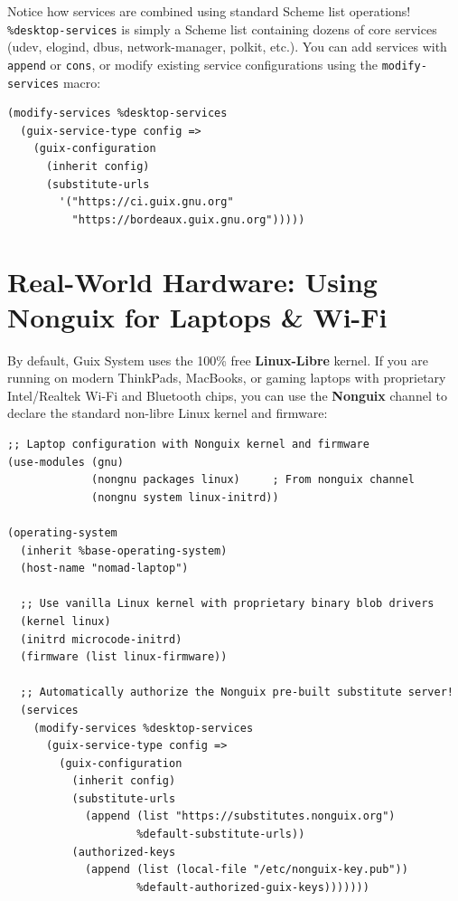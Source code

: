\begin{alchemybox}
Notice how services are combined using standard Scheme list operations!
\texttt{\%desktop-services} is simply a Scheme list containing dozens of core services (udev, elogind, dbus, network-manager, polkit, etc.).
You can add services with \texttt{append} or \texttt{cons}, or modify existing service configurations using the \texttt{modify-services} macro:
\begin{lstlisting}[style=guixscheme]
(modify-services %desktop-services
  (guix-service-type config =>
    (guix-configuration
      (inherit config)
      (substitute-urls
        '("https://ci.guix.gnu.org"
          "https://bordeaux.guix.gnu.org")))))
\end{lstlisting}
\end{alchemybox}

\section{Real-World Hardware: Using Nonguix for Laptops \& Wi-Fi}

By default, Guix System uses the 100\% free \textbf{Linux-Libre} kernel. If you are running on modern ThinkPads, MacBooks, or gaming laptops with proprietary Intel/Realtek Wi-Fi and Bluetooth chips, you can use the \textbf{Nonguix} channel to declare the standard non-libre Linux kernel and firmware:

\begin{lstlisting}[style=guixscheme]
;; Laptop configuration with Nonguix kernel and firmware
(use-modules (gnu)
             (nongnu packages linux)     ; From nonguix channel
             (nongnu system linux-initrd))

(operating-system
  (inherit %base-operating-system)
  (host-name "nomad-laptop")

  ;; Use vanilla Linux kernel with proprietary binary blob drivers
  (kernel linux)
  (initrd microcode-initrd)
  (firmware (list linux-firmware))

  ;; Automatically authorize the Nonguix pre-built substitute server!
  (services
    (modify-services %desktop-services
      (guix-service-type config =>
        (guix-configuration
          (inherit config)
          (substitute-urls
            (append (list "https://substitutes.nonguix.org")
                    %default-substitute-urls))
          (authorized-keys
            (append (list (local-file "/etc/nonguix-key.pub"))
                    %default-authorized-guix-keys)))))))
\end{lstlisting}

